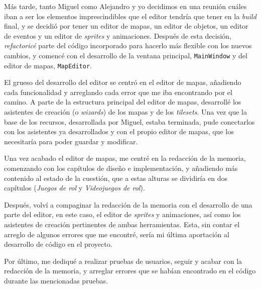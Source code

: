 \medskip

Más tarde, tanto Miguel como Alejandro y yo decidimos en una reunión cuáles iban a ser los elementos imprescindibles que el editor tendría que tener en la \textit{build} final, y se decidió por tener un editor de mapas, un editor de objetos, un editor de eventos y un editor de \textit{sprites} y animaciones. Después de esta decisión, \textit{refactoricé} parte del código incorporado para hacerlo más flexible con los nuevos cambios, y comencé con el desarrollo de la ventana principal, \texttt{MainWindow} y del editor de mapas, \texttt{MapEditor}.

\medskip

El grueso del desarrollo del editor se centró en el editor de mapas, añadiendo cada funcionalidad y arreglando cada error que me iba encontrando por el camino. A parte de la estructura principal del editor de mapas, desarrollé los asistentes de creación (o \textit{wizards}) de los mapas y de los \textit{tilesets}. Una vez que la base de los recursos, desarrollada por Miguel, estaba terminada, pude conectarlos con los asistentes ya desarrollados y con el propio editor de mapas, que los necesitaría para poder guardar y modificar.

\medskip

Una vez acabado el editor de mapas, me centré en la redacción de la memoria, comenzando con los capítulos de diseño e implementación, y añadiendo más contenido al estado de la cuestión, que a estas alturas se dividiría en dos capítulos (\textit{Juegos de rol} y \textit{Videojuegos de rol}).

\smallskip

Después, volví a compaginar la redacción de la memoria con el desarrollo de una parte del editor, en este caso, el editor de \textit{sprites} y animaciones, así como los asistentes de creación pertinentes de ambas herramientas. Esta, sin contar el arreglo de algunos errores que me encontré, sería mi última aportación al desarrollo de código en el proyecto. 

Por último, me dediqué a realizar pruebas de usuarios, seguir y acabar con la redacción de la memoria, y arreglar errores que se habían encontrado en el código durante las mencionadas pruebas.